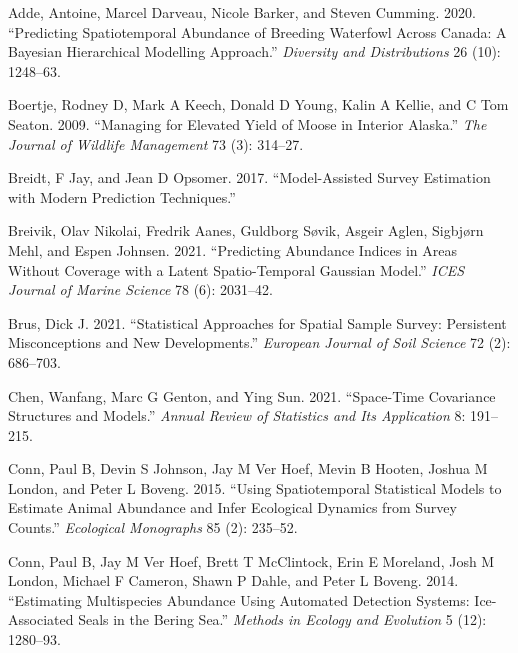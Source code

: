 \documentclass[]{article}    %
\newlength{\cslhangindent}
\newlength{\cslentryspacingunit} %
\newenvironment{CSLReferences}[2] %
 {%
  \setlength{\parindent}{0pt}
  \ifodd #1
  \let\oldpar\par
  \def\par{\hangindent=\cslhangindent\oldpar}
  \fi
  \setlength{\parskip}{#2\cslentryspacingunit}
 }%
 {}
\begin{document}
\hypertarget{refs}{}
\begin{CSLReferences}{1}{0}
\leavevmode{}%
Adde, Antoine, Marcel Darveau, Nicole Barker, and Steven Cumming. 2020.
{``Predicting Spatiotemporal Abundance of Breeding Waterfowl Across
Canada: A Bayesian Hierarchical Modelling Approach.''} \emph{Diversity
and Distributions} 26 (10): 1248--63.

\leavevmode{}%
Boertje, Rodney D, Mark A Keech, Donald D Young, Kalin A Kellie, and C
Tom Seaton. 2009. {``Managing for Elevated Yield of Moose in Interior
Alaska.''} \emph{The Journal of Wildlife Management} 73 (3): 314--27.

\leavevmode{}%
Breidt, F Jay, and Jean D Opsomer. 2017. {``Model-Assisted Survey
Estimation with Modern Prediction Techniques.''}

\leavevmode{}%
Breivik, Olav Nikolai, Fredrik Aanes, Guldborg Søvik, Asgeir Aglen,
Sigbjørn Mehl, and Espen Johnsen. 2021. {``Predicting Abundance Indices
in Areas Without Coverage with a Latent Spatio-Temporal Gaussian
Model.''} \emph{ICES Journal of Marine Science} 78 (6): 2031--42.

\leavevmode{}%
Brus, Dick J. 2021. {``Statistical Approaches for Spatial Sample Survey:
Persistent Misconceptions and New Developments.''} \emph{European
Journal of Soil Science} 72 (2): 686--703.

\leavevmode{}%
Chen, Wanfang, Marc G Genton, and Ying Sun. 2021. {``Space-Time
Covariance Structures and Models.''} \emph{Annual Review of Statistics
and Its Application} 8: 191--215.

\leavevmode{}%
Conn, Paul B, Devin S Johnson, Jay M Ver Hoef, Mevin B Hooten, Joshua M
London, and Peter L Boveng. 2015. {``Using Spatiotemporal Statistical
Models to Estimate Animal Abundance and Infer Ecological Dynamics from
Survey Counts.''} \emph{Ecological Monographs} 85 (2): 235--52.

\leavevmode{}%
Conn, Paul B, Jay M Ver Hoef, Brett T McClintock, Erin E Moreland, Josh
M London, Michael F Cameron, Shawn P Dahle, and Peter L Boveng. 2014.
{``Estimating Multispecies Abundance Using Automated Detection Systems:
Ice-Associated Seals in the Bering Sea.''} \emph{Methods in Ecology and
Evolution} 5 (12): 1280--93.


\end{CSLReferences}
\end{document}
